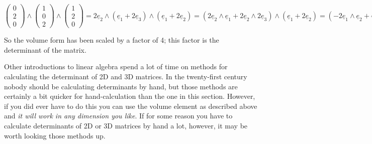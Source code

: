 \documentclass[oneside,english]{amsbook}
\numberwithin{section}{chapter}
\theoremstyle{plain}
\theoremstyle{definition}
\begin{document}
\[{\begin{pmatrix}
		0 \\
		2 \\
		0
	\end{pmatrix} \land \begin{pmatrix}
		1 \\
		0 \\
		2
	\end{pmatrix} \land \begin{pmatrix}
		1 \\
		2 \\
		0
	\end{pmatrix} = 2{\underline{e}}_{2} \land \left( {\underline{e}}_{1} + 2{\underline{e}}_{3} \right) \land \left( {\underline{e}}_{1} + 2{\underline{e}}_{2} \right)
}{= \left( 2{\underline{e}}_{2} \land {\underline{e}}_{1} + 2{\underline{e}}_{2} \land 2{\underline{e}}_{3} \right) \land \left( {\underline{e}}_{1} + 2{\underline{e}}_{2} \right)
}{= \left( - 2{\underline{e}}_{1} \land {\underline{e}}_{2} + 4{\underline{e}}_{2} \land {\underline{e}}_{3} \right) \land \left( {\underline{e}}_{1} + 2{\underline{e}}_{2} \right)
}{= - 2{\underline{e}}_{1} \land {\underline{e}}_{2} \land {\underline{e}}_{1} + 4{\underline{e}}_{2} \land {\underline{e}}_{3} \land {\underline{e}}_{1} - 2{\underline{e}}_{1} \land {\underline{e}}_{2} \land 2{\underline{e}}_{2} + 4{\underline{e}}_{2} \land {\underline{e}}_{3} \land 2{\underline{e}}_{2}
}{= 2{\underline{e}}_{1} \land {\underline{e}}_{1} \land {\underline{e}}_{2} + 4{\underline{e}}_{1} \land {\underline{e}}_{2} \land {\underline{e}}_{3} - 2{\underline{e}}_{1} \land {\underline{e}}_{2} \land 2{\underline{e}}_{2} - 4{\underline{e}}_{2} \land 2{\underline{e}}_{2} \land {\underline{e}}_{3}
}{= 4{\underline{e}}_{1} \land {\underline{e}}_{2} \land {\underline{e}}_{3}}\]

So the volume form has been scaled by a factor of 4; this factor is the
determinant of the matrix.

Other introductions to linear algebra spend a lot of time on methods for
calculating the determinant of 2D and 3D matrices. In the twenty-first
century nobody should be calculating determinants by hand, but those
methods are certainly a bit quicker for hand-calculation than the one in
this section. However, if you did ever have to do this you can use the
volume element as described above and \emph{it will work in any
	dimension you like}. If for some reason you have to calculate
determinants of 2D or 3D matrices by hand a lot, however, it may be
worth looking those methods up.
\end{document}
